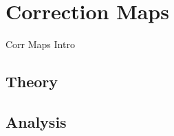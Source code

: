 
\section{Correction Maps}
\label{sec:CorrMap}


Corr Maps Intro

\subsection{Theory}


\subsection{Analysis}


